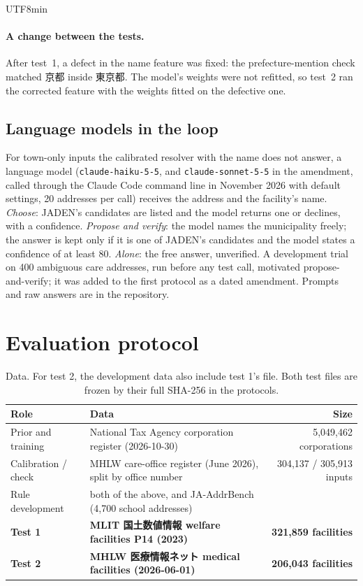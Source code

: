 \documentclass[10pt]{article}
\begin{document}
\begin{CJK}{UTF8}{min}
\paragraph{A change between the tests.} After test~1, a defect in the name feature was fixed: the
prefecture-mention check matched 京都 inside 東京都. The model's weights were not refitted, so test~2 ran
the corrected feature with the weights fitted on the defective one.

\subsection{Language models in the loop}\label{sec:llm}
\begin{sloppypar}
For town-only inputs the calibrated resolver with the name does not answer, a language model
(\texttt{claude-haiku-5-5}, and \texttt{claude-sonnet-5-5} in the
amendment, called through the Claude
Code command line in November 2026 with default settings, 20 addresses per call) receives the address
and the facility's name. \emph{Choose}: JADEN's candidates are listed and the model returns one or
declines, with a confidence. \emph{Propose and verify}: the model names the municipality freely; the
answer is kept only if it is one of JADEN's candidates and the model states a confidence of at least 80.
\emph{Alone}: the free answer, unverified. A development trial on 400 ambiguous care addresses, run before
any test call, motivated propose-and-verify; it was added to the first protocol as a dated amendment.
Prompts and raw answers are in the repository.
\end{sloppypar}

\section{Evaluation protocol}\label{sec:protocol}

\begin{table}[t]
\centering\small
\begin{tabular}{@{}llr@{}}
\toprule
Role & Data & Size \\
\midrule
Prior and training & National Tax Agency corporation register (2026-10-30) & 5,049,462 corporations \\
Calibration / check & MHLW care-office register (June 2026), split by office number & 304,137 / 305,913 inputs \\
Rule development & both of the above, and JA-AddrBench (4,700 school addresses) & \\
\textbf{Test 1} & \textbf{MLIT 国土数値情報 welfare facilities P14 (2023)} & \textbf{321,859 facilities} \\
\textbf{Test 2} & \textbf{MHLW 医療情報ネット medical facilities (2026-06-01)} & \textbf{206,043 facilities} \\
\bottomrule
\end{tabular}
\caption{Data. For test 2, the development data also include test 1's file. Both test files are frozen by
their full SHA-256 in the protocols.}
\label{tab:data}
\end{table}


\end{CJK}
\end{document}
